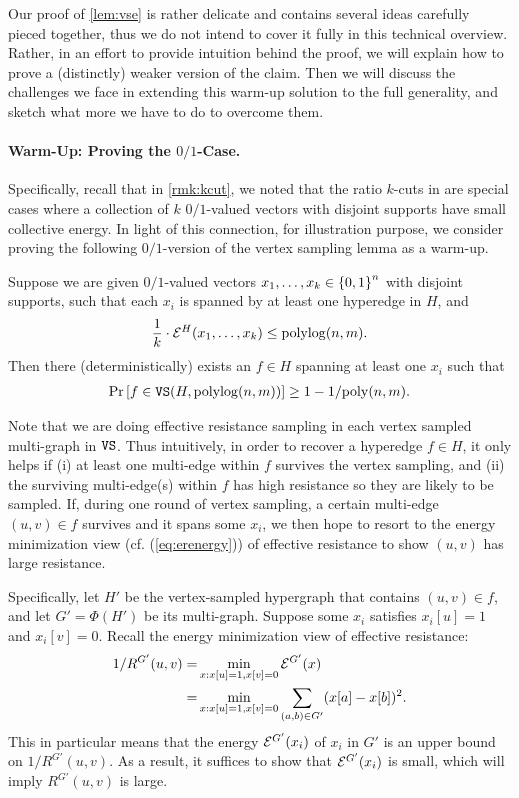 \documentclass{article}
\begin{document}
Our proof of \cref{lem:vse} is rather delicate and contains several ideas carefully
pieced together, thus we do not intend to cover it fully in this technical overview.
Rather, in an effort to provide intuition behind the proof,
we will explain how to prove a (distinctly) weaker version of the claim.
Then
we will discuss the challenges we face in extending this warm-up solution to the full generality, and sketch what more we have to do to overcome them.

\paragraph{Warm-Up: Proving the $0/1$-Case.}
Specifically, recall that in \cref{rmk:kcut}, we noted that the ratio $k$-cuts
in \cite{Qua23} are special cases where a collection of $k$ $0/1$-valued vectors
with disjoint supports
have small collective energy.
In light of this connection, for illustration purpose,
we consider proving the following $0/1$-version of the vertex sampling lemma
as a warm-up.

\begin{lemma}\label{lem:svse}
Suppose we are given
$0/1$-valued vectors $x_1,\ldots,x_k\in \left\{0,1 \right\}^{n}$
with disjoint supports,
such that
each $x_i$ is spanned by at least one hyperedge in $H$,
and
\begin{align}
\frac{1}{k} \cdot \mathcal{E}^H(x_1,\ldots,x_k) \leq \operatorname{polylog}(n,m).   
\end{align}
Then there (deterministically) exists an $f\in H$ spanning at least one $x_i$ such that
    \begin{align*}
        \mathrm{Pr}\left[ f\in \mathtt{VS}(H, \operatorname{polylog}(n,m)) \right]
        \geq 1 - 1/\mathrm{poly}(n,m).
    \end{align*}
\end{lemma}

Note that we are doing effective resistance sampling in each vertex sampled multi-graph
in $\mathtt{VS}$. Thus intuitively, in order to recover a hyperedge $f\in H$,
it only helps if (i) at least one multi-edge within $f$ survives the vertex sampling,
and (ii) the surviving multi-edge(s) within $f$
has high resistance so they are likely to be sampled.
If, during one round of vertex sampling, a certain multi-edge $(u,v)\in f$
survives and it spans some $x_i$, we then hope to resort to the energy minimization
view (cf. (\ref{eq:erenergy})) of effective resistance to show $(u,v)$ has large resistance.

Specifically, let $H'$ be the vertex-sampled hypergraph that contains $(u,v)\in f$,
and let $G' = \Phi(H')$ be its multi-graph.
Suppose some $x_i$ satisfies $x_i[u] = 1$ and $x_i[v] = 0$.
Recall the energy minimization view of effective resistance:
\begin{align*}
    1/R^{G'}(u,v) =
    & \min_{x: x[u]=1, x[v]=0} \mathcal{E}^{G'}(x) \\ =
    & \min_{x: x[u]=1, x[v]=0} \sum_{(a,b)\in G'} (x[a] - x[b])^2.
\end{align*}
This in particular means that the energy $\mathcal{E}^{G'}(x_i)$ of $x_i$ in $G'$
is an upper bound on $1/R^{G'}(u,v)$.
As a result, it suffices to show that $\mathcal{E}^{G'}(x_i)$ is small,
which will imply $R^{G'}(u,v)$ is large.
\end{document}
